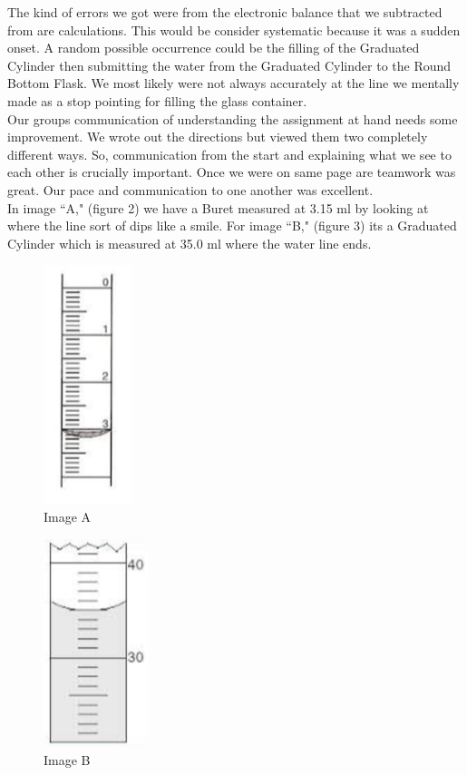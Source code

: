 \documentclass[10pt]{article}
\begin{document}
\hspace{5ex}The kind of errors we got were from the electronic balance that we subtracted from are calculations. This would be consider systematic because it was a sudden onset. A random possible occurrence could be the filling of the Graduated Cylinder then submitting the water from the Graduated Cylinder to the Round Bottom Flask. We most likely were not always accurately at the line we mentally made as a stop pointing for filling the glass container. \\

\hspace{5ex}Our groups communication of understanding the assignment at hand needs some improvement. We wrote out the directions but viewed them two completely different ways. So, communication from the start and explaining what we see to each other is crucially important. Once we were on same page are teamwork was great. Our pace and communication to one another was excellent. \\

\hspace{5ex}In image ``A," (figure 2) we have a Buret measured at 3.15 ml by looking at where the line sort of dips like a smile. For image ``B," (figure 3) its a Graduated Cylinder which is measured at 35.0 ml where the water line ends.\\
\begin{figure}[H]
\hfill\includegraphics[width=.7in]{imageA}\hspace*{\fill}
\caption[Image A]{Image A}
\end{figure}
\begin{figure}[H]
\hfill\includegraphics[width=.7in]{imageB}\hspace*{\fill}
\caption[Image B]{Image B}
\end{figure}
\end{document}
